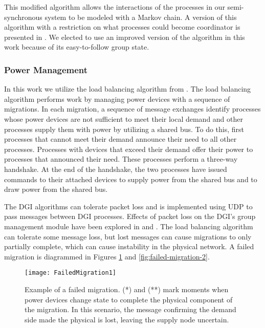 This modified algorithm allows the interactions of the processes in our semi-synchronous system to be modeled with a Markov chain.
A version of this algorithm with a restriction on what processes could become coordinator is presented in \cite{JOURNAL}.
We elected to use an improved version of the algorithm in this work because of its easy-to-follow group state.

\subsubsection{Power Management}

In this work we utilize the load balancing algorithm from \cite{LOADBALANCING}.
The load balancing algorithm performs work by managing power devices with a sequence of migrations\cite{HILTESTBED}.
In each migration, a sequence of message exchanges identify processes whose power devices are not sufficient to meet their local demand and other processes supply them with power by utilizing a shared bus.
To do this, first processes that cannot meet their demand announce their need to all other processes.
Processes with devices that exceed their demand offer their power to processes that announced their need.
These processes perform a three-way handshake.
At the end of the handshake, the two processes have issued commands to their attached devices to supply power from the shared bus and to draw power from the shared bus.

The \ac{DGI} algorithms can tolerate packet loss and is implemented using UDP to pass messages between \ac{DGI} processes.
Effects of packet loss on the \ac{DGI}'s group management module have been explored in \cite{CRITIS2012} and \cite{JOURNAL}.
The load balancing algorithm can tolerate some message loss, but lost messages can cause migrations to only partially complete, which can cause instability in the physical network.
A failed migration is diagrammed in Figures \ref{fig:failed-migration-1} and \ref{fig:failed-migration-2}.

\begin{figure}
\centering
\texttt{[image: FailedMigration1]}
\caption{Example of a failed migration. (*) and (**) mark moments when power devices change state to complete the physical component of the migration. In this scenario, the message confirming the demand side made the physical is lost, leaving the supply node uncertain.}
\label{fig:failed-migration-1}
\end{figure}

